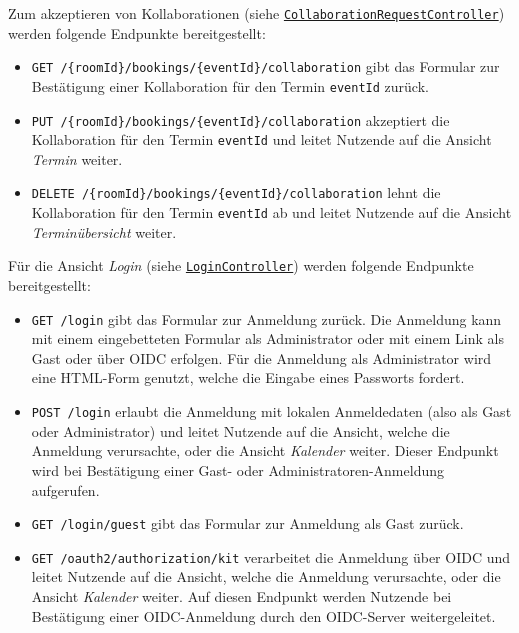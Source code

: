 Zum akzeptieren von Kollaborationen (siehe \hyperref[edu.kit.hci.soli.controller.CollaborationRequestController]{\texttt{CollaborationRequestController}}) werden folgende Endpunkte bereitgestellt:
\begin{itemize}
    \item \texttt{GET /\{roomId\}/bookings/\{eventId\}/collaboration} gibt das Formular zur Bestätigung einer Kollaboration für den Termin \texttt{eventId} zurück.
    \item \texttt{PUT /\{roomId\}/bookings/\{eventId\}/collaboration} akzeptiert die Kollaboration für den Termin \texttt{eventId} und leitet Nutzende auf die Ansicht \textit{Termin} weiter.
    \item \texttt{DELETE /\{roomId\}/bookings/\{eventId\}/collaboration} lehnt die Kollaboration für den Termin \texttt{eventId} ab und leitet Nutzende auf die Ansicht \textit{Terminübersicht} weiter.
\end{itemize}

Für die Ansicht \textit{Login} (siehe \hyperref[edu.kit.hci.soli.controller.LoginController]{\texttt{LoginController}}) werden folgende Endpunkte bereitgestellt:
\begin{itemize}
    \item \texttt{GET /login} gibt das Formular zur Anmeldung zurück. Die Anmeldung kann mit einem eingebetteten Formular als Administrator oder mit einem Link als Gast oder über \gls{OIDC} erfolgen.
          Für die Anmeldung als Administrator wird eine \gls{HTML-Form} genutzt, welche die Eingabe eines Passworts fordert.
    \item \texttt{POST /login} erlaubt die Anmeldung mit lokalen Anmeldedaten (also als Gast oder Administrator) und leitet Nutzende auf die Ansicht, welche die Anmeldung verursachte, oder die Ansicht \textit{Kalender} weiter.
          Dieser Endpunkt wird bei Bestätigung einer Gast- oder Administratoren-Anmeldung aufgerufen.
    \item \texttt{GET /login/guest} gibt das Formular zur Anmeldung als Gast zurück.
    \item \texttt{GET /oauth2/authorization/kit} verarbeitet die Anmeldung über \gls{OIDC} und leitet Nutzende auf die Ansicht, welche die Anmeldung verursachte, oder die Ansicht \textit{Kalender} weiter.
          Auf diesen Endpunkt werden Nutzende bei Bestätigung einer \gls{OIDC}-Anmeldung durch den OIDC-Server weitergeleitet.
\end{itemize}

